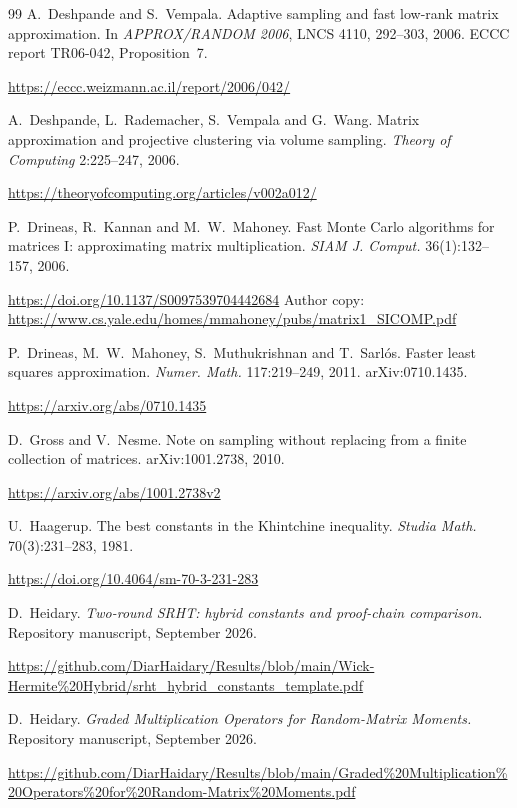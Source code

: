 \documentclass[11pt,a4paper]{article}
\theoremstyle{definition}
\theoremstyle{remark}
\numberwithin{equation}{section}
\begin{document}
\begin{thebibliography}{99}
A.~Deshpande and S.~Vempala.
\newblock Adaptive sampling and fast low-rank matrix approximation.
\newblock In \emph{APPROX/RANDOM 2006}, LNCS 4110, 292--303, 2006. ECCC report TR06-042, Proposition~7.

\newblock \url{https://eccc.weizmann.ac.il/report/2006/042/}

A.~Deshpande, L.~Rademacher, S.~Vempala and G.~Wang.
\newblock Matrix approximation and projective clustering via volume sampling.
\newblock \emph{Theory of Computing} 2:225--247, 2006.

\newblock \url{https://theoryofcomputing.org/articles/v002a012/}

P.~Drineas, R.~Kannan and M.~W.~Mahoney.
\newblock Fast Monte Carlo algorithms for matrices I: approximating matrix multiplication.
\newblock \emph{SIAM J. Comput.} 36(1):132--157, 2006.

\newblock \url{https://doi.org/10.1137/S0097539704442684}
\newblock Author copy: \url{https://www.cs.yale.edu/homes/mmahoney/pubs/matrix1_SICOMP.pdf}

P.~Drineas, M.~W.~Mahoney, S.~Muthukrishnan and T.~Sarl\'os.
\newblock Faster least squares approximation.
\newblock \emph{Numer. Math.} 117:219--249, 2011. arXiv:0710.1435.

\newblock \url{https://arxiv.org/abs/0710.1435}

D.~Gross and V.~Nesme.
\newblock Note on sampling without replacing from a finite collection of matrices.
\newblock arXiv:1001.2738, 2010.

\newblock \url{https://arxiv.org/abs/1001.2738v2}

U.~Haagerup.
\newblock The best constants in the Khintchine inequality.
\newblock \emph{Studia Math.} 70(3):231--283, 1981.

\newblock \url{https://doi.org/10.4064/sm-70-3-231-283}

D.~Heidary.
\newblock \emph{Two-round SRHT: hybrid constants and proof-chain comparison.}
\newblock Repository manuscript, September 2026.

\newblock \url{https://github.com/DiarHaidary/Results/blob/main/Wick-Hermite%20Hybrid/srht_hybrid_constants_template.pdf}

D.~Heidary.
\newblock \emph{Graded Multiplication Operators for Random-Matrix Moments.}
\newblock Repository manuscript, September 2026.

\newblock \url{https://github.com/DiarHaidary/Results/blob/main/Graded%20Multiplication%20Operators%20for%20Random-Matrix%20Moments.pdf}


\end{thebibliography}
\end{document}

